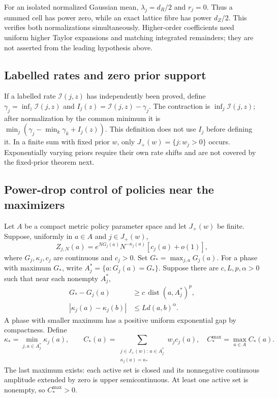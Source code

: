 For an isolated normalized Gaussian mean, $\lambda_j=d_R/2$ and $r_j=0$.
Thus a summed cell has power zero, while an exact lattice fibre has power
$d_Z/2$.  This verifies both normalizations simultaneously.  Higher-order
coefficients need uniform higher Taylor expansions and matching integrated
remainders; they are not asserted from the leading hypothesis above.

\subsection{Labelled rates and zero prior support}

If a labelled rate $\mathcal I(j,z)$ has independently been proved, define
$\gamma_j=\inf_z\mathcal I(j,z)$ and
$I_j(z)=\mathcal I(j,z)-\gamma_j$.  The contraction is
$\inf_j\mathcal I(j,z)$; after normalization by the common minimum it is
$\min_j(\gamma_j-\min_k\gamma_k+I_j(z))$.
This definition does not use $I_j$ before defining it.
In a finite sum with fixed prior $w$, only
$J_+(w)=\{j:w_j>0\}$ occurs.  Exponentially varying priors require their own
rate shifts and are not covered by the fixed-prior theorem next.

\subsection{Power-drop control of policies near the maximizers}

Let $A$ be a compact metric policy parameter space and let $J_+(w)$ be finite.
Suppose, uniformly in $a\in A$ and $j\in J_+(w)$,
\begin{equation}\label{eq:r33-d1-policy}
 Z_{j,N}(a)=e^{NG_j(a)}N^{-\kappa_j(a)}[c_j(a)+o(1)],
\end{equation}
where $G_j,\kappa_j,c_j$ are continuous and $c_j>0$.
Set $G_* =\max_{j,a}G_j(a)$.  For a phase with maximum $G_*$, write
$A_j^*=\{a:G_j(a)=G_*\}$.  Suppose there are $c,L,p,\alpha>0$ such that
near each nonempty $A_j^*$,
\begin{align}
 G_*-G_j(a)&\ge c\,\operatorname{dist}(a,A_j^*)^p,
 \label{eq:r33-d1-drop}\\
 |\kappa_j(a)-\kappa_j(b)|&\le Ld(a,b)^\alpha.
 \label{eq:r33-d1-holder}
\end{align}
A phase with smaller maximum has a positive uniform exponential gap by
compactness.  Define
\[
 \kappa_* =\min_{j,a\in A_j^*}\kappa_j(a),\qquad
 C_*(a)=\sum_{\substack{j\in J_+(w):\,a\in A_j^*\\
                              \kappa_j(a)=\kappa_*}}w_jc_j(a),
 \quad C_*^{\max}=\max_{a\in A} C_*(a).
\]
The last maximum exists: each active set is closed and its nonnegative
continuous amplitude extended by zero is upper semicontinuous.  At least
one active set is nonempty, so $C_*^{\max}>0$.

